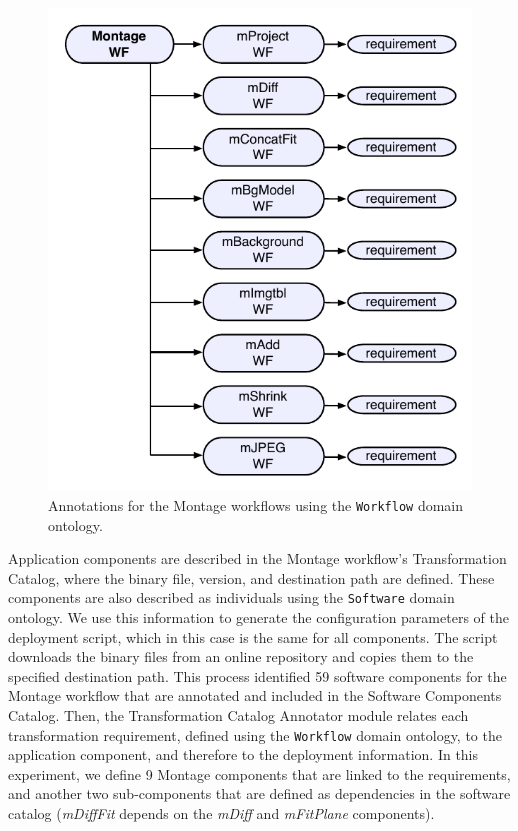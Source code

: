 \begin{figure}[!htb]
	\centering
	\includegraphics[width=.7\linewidth]{figures/annotations-montage}
	\vspace{-10pt}
	\caption{Annotations for the Montage workflows using the \texttt{Workflow} domain ontology.}
	\label{fig:annotations-montage}
\end{figure}

Application components are described in the Montage workflow's Transformation 
Catalog, where the binary file, version, and destination path are defined. These 
components are also described as individuals using the \texttt{Software} domain 
ontology. We use this information to generate the configuration parameters of the 
deployment script, which in this case is the same for all components. The script 
downloads the binary files from an online repository and copies them to the specified 
destination path. This process identified 59 software components for the Montage 
workflow that are annotated and included in the Software Components Catalog.
Then, the Transformation Catalog Annotator module relates each transformation 
requirement, defined using the \texttt{Workflow} domain ontology, to the application 
component, and therefore to the deployment information. In this experiment, we 
define 9 Montage components that are linked to the requirements, and another two 
sub-components that are defined as dependencies in the software catalog 
(\emph{mDiffFit} depends on the \emph{mDiff} and \emph{mFitPlane} components).



